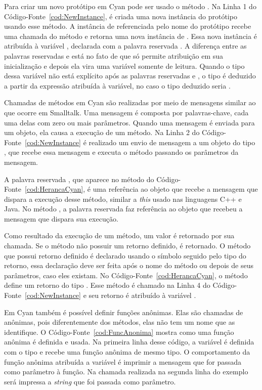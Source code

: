 Para criar um novo protótipo em Cyan pode ser usado o método . Na Linha 1 do Código-Fonte~\ref{cod:NewInstance}, é criada uma nova instância do protótipo  usando esse método. A instância de  referenciada pelo nome do protótipo recebe uma chamada do método  e retorna uma nova instância de . Essa nova instância é atribuída à variável , declarada com a palavra reservada . A diferença entre as palavras reservadas  e  está no fato de que  só permite atribuição em sua inicialização e depois ela vira uma variável somente de leitura. Quando o tipo dessa variável não está explícito após as palavras reservadas  e , o tipo é deduzido a partir da expressão atribuída à variável, no caso o tipo deduzido seria .

Chamadas de métodos em Cyan são realizadas por meio de mensagens similar ao que ocorre em Smalltalk. Uma mensagem é composta por palavras-chave, cada uma delas com zero ou mais parâmetros. Quando uma mensagem é enviada para um objeto, ela causa a  execução de um método. Na Linha 2 do Código-Fonte~\ref{cod:NewInstance} é realizado um envio de mensagem a um objeto do tipo , que recebe essa mensagem e executa o método  passando os parâmetros da mensagem.

A palavra reservada , que aparece no método do Código-Fonte~\ref{cod:HerancaCyan}, é uma referência ao objeto que recebe a mensagem que dispara a execução desse método, similar a \emph{this} usado nas linguagens C++ e Java. No método , a palavra reservada  faz referência ao objeto que recebeu a mensagem que dispara sua execução.

Como resultado da execução de um método, um valor é retornado por sua chamada. Se o método não possuir um retorno definido,  é retornado. O método que possui retorno definido é declarado usando o símbolo \srcstyle{->} seguido pelo tipo do retorno, essa declaração deve ser feita após o nome do método ou depois de seus parâmetros, caso eles existam. No Código-Fonte~\ref{cod:HerancaCyan}, o método  define um retorno do tipo . Esse método é chamado na Linha 4 do Código-Fonte~\ref{cod:NewInstance} e seu retorno é atribuído à variável .

Em Cyan também é possível definir funções anônimas. Elas são chamadas de anônimas, pois diferentemente dos métodos, elas não tem um nome que as identifique. O Código-Fonte~\ref{cod:FuncAnonima} mostra como uma função anônima é definida e usada. Na primeira linha desse código, a variável  é definida com o tipo  e recebe uma função anônima de mesmo tipo. O comportamento da função anônima atribuída a variável  é imprimir a mensagem que for passada como parâmetro à função. Na chamada realizada na segunda linha do exemplo será impressa a \emph{string}  que foi passada como parâmetro.

